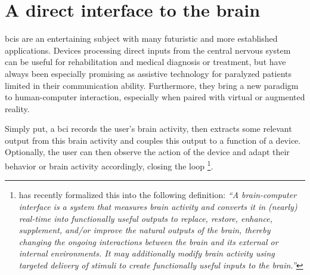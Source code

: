 
\section{A direct interface to the brain}
\ac{bci}s are an entertaining subject with many futuristic and more established
applications.
Devices processing direct inputs from the central nervous system can be
useful for rehabilitation and medical diagnosis or treatment, but
have always been especially promising as assistive technology for
paralyzed patients limited in their communication ability.
Furthermore, they bring a new paradigm to human-computer interaction,
especially when paired with virtual or augmented reality.

Simply put, a \ac{bci} records the user's brain activity, then extracts some
relevant output from this brain activity and couples this output to a function
of a device.
Optionally, the user can then observe the action of the device and adapt their
behavior or brain activity accordingly, closing the loop
\footnote{
  \textcite{BCISociety2024} has recently formalized this into the
  following definition:
  \it``A brain-computer interface is a system that measures brain activity and
  converts it in (nearly) real-time into functionally useful outputs to replace,
  restore, enhance, supplement, and/or improve the natural outputs of the brain,
  thereby changing the ongoing interactions between the brain and its external or
  internal environments. It may additionally modify brain activity using targeted
  delivery of stimuli to create functionally useful inputs to the
  brain.''
}.


